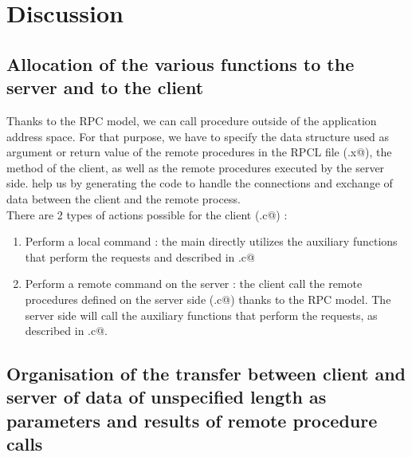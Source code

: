 \documentclass{article}
\begin{document}
\newpage


\section{Discussion}

\subsection{Allocation of the various functions to the server and to the client}
Thanks to the RPC model, we can call procedure outside of the application address space. For that purpose, we have to specify the data structure used as argument or return value of the remote procedures in the RPCL file (\verb@rpspec.x@), the \verb@main@ method of the client, as well as the remote procedures executed by the server side. \verb@RPCGEN@ help us by generating the code to handle the connections and exchange of data between the client and the remote process.\\

There are 2 types of actions possible for the client (\verb@myftp.c@) :
\begin{enumerate}
\item Perform a local command : the main directly utilizes the auxiliary functions that perform the requests and described in \verb@utils.c@
\item Perform a remote command on the server : the client call the remote procedures defined on the server side (\verb@myftpd.c@) thanks to the RPC model. The server side will call the auxiliary functions that perform the requests, as described in \verb@utils.c@.
\end{enumerate}

\subsection{Organisation of the transfer between client and server of data of unspecified length as parameters and results of remote procedure calls}
\end{document}
